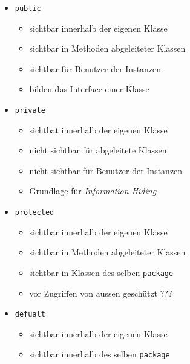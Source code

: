 \begin{itemize}
	\item \lstinline{public}
		\begin{itemize}
			\item sichtbar innerhalb der eigenen Klasse
			\item sichtbar in Methoden abgeleiteter Klassen
			\item sichtbar für Benutzer der Instanzen
			\item bilden das Interface einer Klasse
		\end{itemize}
	\item \lstinline{private}
		\begin{itemize}
			\item sichtbat innerhalb der eigenen Klasse
			\item nicht sichtbar für abgeleitete Klassen
			\item nicht sichtbar für Benutzer der Instanzen
			\item Grundlage für \textit{Information Hiding}
		\end{itemize}
	\item \lstinline{protected}
		\begin{itemize}
			\item sichtbar innerhalb der eigenen Klasse
			\item sichtbar in Methoden abgeleiteter Klassen
			\item sichtbar in Klassen des selben 
				\lstinline{package}
			\item vor Zugriffen von aussen geschützt ???
		\end{itemize}
	\item \lstinline{defualt}
		\begin{itemize}
			\item sichtbar innerhalb der eigenen Klasse
			\item sichtbar innerhalb des selben 
				\lstinline{package}
		\end{itemize}
\end{itemize}

\noindent



